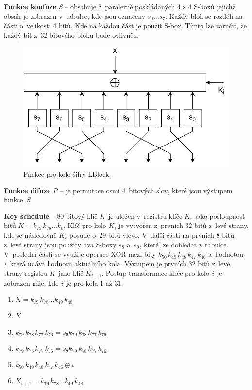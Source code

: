 \noindent \textbf{Funkce konfuze} \textit{S} -- obsahuje 8~paralerně poskládaných $4 \times 4$ S-boxů jejichž obsah je zobrazen v~tabulce, kde jsou označeny $s_0\dots s_7$. Každý blok se rozdělí na části o~velikosti 4 bitů. Kde na každou část je použit S-box. Tímto lze zaručit, že každý bit z~32 bitového bloku bude ovlivněn.\cite{LBlock}
\begin{figure}[!h]
  \begin{center}
    \includegraphics[scale=0.8]{obrazky/RoundLBLOCK.pdf}
  \end{center}
  \caption[Funkce pro kolo šifry LBlock]{Funkce pro kolo šifry LBlock.\cite{LBlock}}
  \label{img:roundLblock}
\end{figure}

\noindent \textbf{Funkce difuze} \textit{P} -- je permutace osmi 4~bitových slov, které jsou výstupem funkce~\textit{S}

\noindent \textbf{Key schedule} -- 80 bitový klíč \textit{K}~je uložen v~registru klíče $K_r$ jako posloupnost bitů $K = k_{79}\,k_{78}\dots k_{0}$. Klíč pro kolo $K_i$ je vytvořen z~prvních 32 bitů z~levé strany, kde se následovně $K_r$ posune o~29 bitů vlevo. V~další části na prvních 8 bitů z~levé strany jsou použity dva S-boxy $s_8$ a~$s_9$, které lze dohledat v tabulce. V~poslední částí se využije operace XOR mezi bity $k_{50}\,k_{49}\,k_{48}\,k_{47}\,k_{46}$ a~hodnotou \textit{i}, která udává hodnotu aktuálního kola. Výstupem je prvních 32 bitů z~levé strany registru \textit{K}~jako klíč $K_{i+1}$. Postup transformace klíče pro kolo \textit{i}~je zobrazen níže, kde \textit{i}~je pro kola 1 až 31.\cite{LBlock}
\begin{enumerate}[label=(\Alph*)]
    \item $K = k_{79}\,k_{78}\dots k_{49}\,k_{48}$
    \item \textit{K} 
    \item $k_{79}\,k_{78}\,k_{77}\,k_{76} = s_9 k_{79}\,k_{78}\,k_{77}\,k_{76}$
    \item $k_{79}\,k_{78}\,k_{77}\,k_{76} = s_9 k_{79}\,k_{78}\,k_{77}\,k_{76}$
    \item $k_{50}\,k_{49}\,k_{48}\,k_{47}\,k_{46} \oplus i$ 
    \item $K_{i+1} = k_{79}\,k_{78}\dots k_{49}\,k_{48}$
\end{enumerate}

